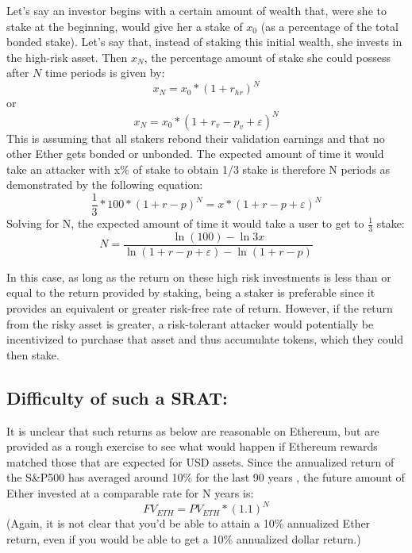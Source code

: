 \documentclass{article}
\renewcommand{\|}{\;|\;}
\begin{document}
Let's say an investor begins with a certain amount of wealth that, were she to stake at the beginning, would give her a stake of $x_{0}$ (as a percentage of the total bonded stake). Let's say that, instead of staking this initial wealth, she invests in the high-risk asset. Then $x_{N}$, the percentage amount of stake she could possess after $N$ time periods is given by:
\begin{equation}
x_{N} = x_{0} * (1 + r_{hr})^N 
\end{equation}
or
\eq\begin{equation} 
x_{N} = x_{0} * (1 + r_{v} - p_{v} + \varepsilon)^N
\end{equation}\newline 
This is assuming that all stakers rebond their validation earnings and that no other Ether gets bonded or unbonded. The expected amount of time it would take an attacker with x\% of stake to obtain 1/3 stake is therefore N periods as demonstrated by the following equation:
\begin{equation}
\frac{1}{3} *  100 * (1 + r - p)^N  = x * (1 + r - p + \varepsilon)^N   
\end{equation}
Solving for N, the expected amount of time it would take a user to get to $\frac{1}{3}$ stake:
\begin{equation}
N = \frac{\ln{(100)}- \ln{3x}}{ \ln{(1 + r -p + \varepsilon)} - \ln{(1 + r - p)}}
\end{equation} \newline 

In this case, as long as the return on these high risk investments is less than or equal to the return provided by staking, being a staker is preferable since it provides an equivalent or greater risk-free rate of return. However, if the return from the risky asset is greater, a risk-tolerant attacker would potentially be incentivized to purchase that asset and thus accumulate tokens, which they could then stake. \newline


\subsection{Difficulty of such a SRAT:}

It is unclear that such returns as below are reasonable on Ethereum, but are provided as a rough exercise to see what would happen if Ethereum rewards matched those that are expected for USD assets. \newline\newline Since the annualized return of the S&P500 has averaged around 10\% for the last 90 years \cite{Snider}, the future amount of Ether invested at a comparable rate for N years is:
\begin{equation}
FV_{ETH} = PV_{ETH} * (1.1)^N
\end{equation}
(Again, it is not clear that you'd be able to attain a 10\% annualized Ether return, even if you would be able to get a 10\% annualized dollar return.)\newline
\end{document}
